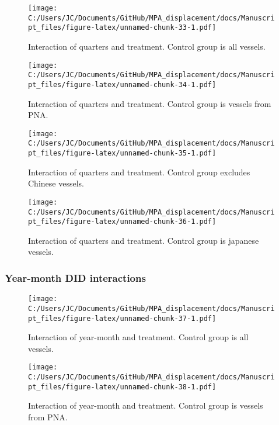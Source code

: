 \documentclass[11pt,]{article}
\begin{document}
\begin{figure}
\centering
\texttt{[image: C:/Users/JC/Documents/GitHub/MPA\_displacement/docs/Manuscript\_files/figure-latex/unnamed-chunk-33-1.pdf]}
\caption{\label{fig:unnamed-chunk-33}\label{fig:q1}Interaction of quarters
and treatment. Control group is all vessels.}
\end{figure}

\begin{figure}
\centering
\texttt{[image: C:/Users/JC/Documents/GitHub/MPA\_displacement/docs/Manuscript\_files/figure-latex/unnamed-chunk-34-1.pdf]}
\caption{\label{fig:unnamed-chunk-34}\label{fig:q2}Interaction of quarters
and treatment. Control group is vessels from PNA.}
\end{figure}

\begin{figure}
\centering
\texttt{[image: C:/Users/JC/Documents/GitHub/MPA\_displacement/docs/Manuscript\_files/figure-latex/unnamed-chunk-35-1.pdf]}
\caption{\label{fig:unnamed-chunk-35}\label{fig:q3}Interaction of quarters
and treatment. Control group excludes Chinese vessels.}
\end{figure}

\begin{figure}
\centering
\texttt{[image: C:/Users/JC/Documents/GitHub/MPA\_displacement/docs/Manuscript\_files/figure-latex/unnamed-chunk-36-1.pdf]}
\caption{\label{fig:unnamed-chunk-36}\label{fig:q4}Interaction of quarters
and treatment. Control group is japanese vessels.}
\end{figure}

\hypertarget{year-month-did-interactions}{%
\subsubsection{Year-month DID
interactions}\label{year-month-did-interactions}}

\begin{figure}
\centering
\texttt{[image: C:/Users/JC/Documents/GitHub/MPA\_displacement/docs/Manuscript\_files/figure-latex/unnamed-chunk-37-1.pdf]}
\caption{\label{fig:unnamed-chunk-37}\label{fig:ym1}Interaction of
year-month and treatment. Control group is all vessels.}
\end{figure}

\begin{figure}
\centering
\texttt{[image: C:/Users/JC/Documents/GitHub/MPA\_displacement/docs/Manuscript\_files/figure-latex/unnamed-chunk-38-1.pdf]}
\caption{\label{fig:unnamed-chunk-38}\label{fig:ym2}Interaction of
year-month and treatment. Control group is vessels from PNA.}
\end{figure}
\end{document}

